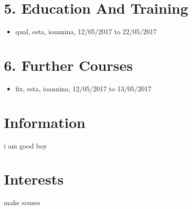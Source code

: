 \documentclass{article}
\begin{document}
 \section{5. Education And Training} 
\begin{itemize} 
\item {qual, esta, ioannina, 12/05/2017 to 22/05/2017}
\end{itemize} 
 \section{6. Further Courses} 
\begin{itemize} 
\item {fix, esta, ioannina, 12/05/2017 to 13/05/2017}
\end{itemize} 
 \section{Information} 
 {i am good boy}
 \section{Interests} 
 {make souzes}
\end{document}
